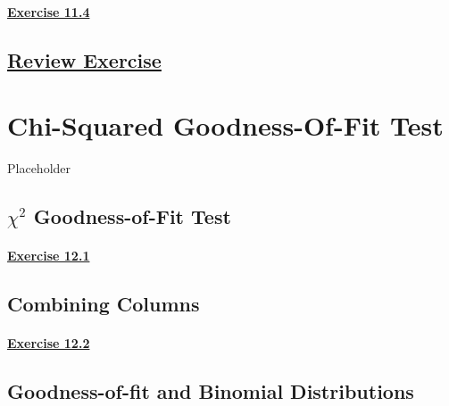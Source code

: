 \documentclass[
  11pt,
]{book}
\begin{document}
\subsubsection*{\texorpdfstring{\hyperref[ex114a]{Exercise 11.4}}{Exercise 11.4}}\label{exercise-11.4}

\section*{\texorpdfstring{\hyperref[re11a]{Review Exercise}}{Review Exercise}}\label{review-exercise-10}

\chapter{Chi-Squared Goodness-Of-Fit Test}\label{chi-squared-goodness-of-fit-test}

Placeholder

\section{\texorpdfstring{\(\chi^{\text{2}}\) Goodness-of-Fit Test}{\textbackslash chi\^{}\{\textbackslash text\{2\}\} Goodness-of-Fit Test}}\label{chitext2-goodness-of-fit-test}

\subsubsection*{\texorpdfstring{\hyperref[ex121a]{Exercise 12.1}}{Exercise 12.1}}\label{exercise-12.1}

\section{Combining Columns}\label{combining-columns}

\subsubsection*{\texorpdfstring{\hyperref[ex122a]{Exercise 12.2}}{Exercise 12.2}}\label{exercise-12.2}

\section{Goodness-of-fit and Binomial Distributions}\label{goodness-of-fit-and-binomial-distributions}
\end{document}
